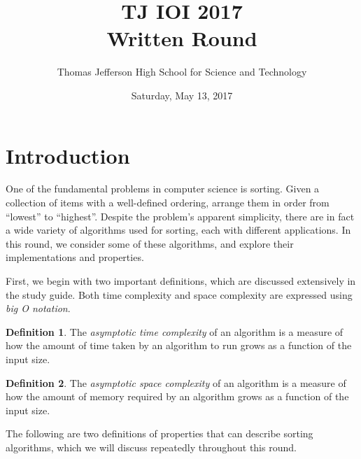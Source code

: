 \documentclass{exam}
\theoremstyle{definition}
\theoremstyle{definition}
\newtheorem{definition}{Definition}[section]
\begin{document}
\title{
    {\Huge TJ IOI 2017}\\
    {\Huge Written Round}
}

\author{
	\large
	Thomas Jefferson High School for Science and Technology
}
\date{\large Saturday, May 13, 2017}

\begin{titlepage}
    \maketitle
\end{titlepage}


\tableofcontents
\newpage


\newpage




\section{Introduction}

One of the fundamental problems in computer science is sorting. Given a collection of items with a well-defined ordering, arrange them in order from ``lowest'' to ``highest''. Despite the problem's apparent simplicity, there are in fact a wide variety of algorithms used for sorting, each with different applications. In this round, we consider some of these algorithms, and explore their implementations and properties.

First, we begin with two important definitions, which are discussed extensively in the study guide. Both time complexity and space complexity are expressed using \textit{big O notation}.

\begin{definition}
    The \textit{asymptotic time complexity} of an algorithm is a measure of how the amount of time taken by an algorithm to run grows as a function of the input size. 
\end{definition}

\begin{definition}
    The \textit{asymptotic space complexity} of an algorithm is a measure of how the amount of memory required by an algorithm grows as a function of the input size. 
\end{definition} 

The following are two definitions of properties that can describe sorting algorithms, which we will discuss repeatedly throughout this round.
\end{document}
